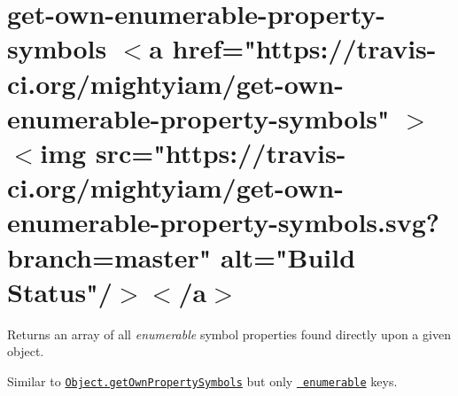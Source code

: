 \chapter{get-\/own-\/enumerable-\/property-\/symbols \texorpdfstring{$<$}{<}a href="{}https\+://travis-\/ci.\+org/mightyiam/get-\/own-\/enumerable-\/property-\/symbols"{} \texorpdfstring{$>$}{>}\texorpdfstring{$<$}{<}img src="{}https\+://travis-\/ci.\+org/mightyiam/get-\/own-\/enumerable-\/property-\/symbols.\+svg?branch=master"{} alt="{}\+Build Status"{}/\texorpdfstring{$>$}{>}\texorpdfstring{$<$}{<}/a\texorpdfstring{$>$}{>}}
\hypertarget{md_pkiclassroomrescheduler_2src_2main_2frontend_2node__modules_2get-own-enumerable-property-symbols_2_r_e_a_d_m_e}{}\label{md_pkiclassroomrescheduler_2src_2main_2frontend_2node__modules_2get-own-enumerable-property-symbols_2_r_e_a_d_m_e}
\label{md_pkiclassroomrescheduler_2src_2main_2frontend_2node__modules_2get-own-enumerable-property-symbols_2_r_e_a_d_m_e_autotoc_md13192}%
%
 Returns an array of all {\itshape enumerable} symbol properties found directly upon a given object.

Similar to \href{https://developer.mozilla.org/en-US/docs/Web/JavaScript/Reference/Global_Objects/Object/getOwnPropertySymbols}{\texttt{ {\ttfamily Object.\+get\+Own\+Property\+Symbols}}} but only \href{https://developer.mozilla.org/en-US/docs/Web/JavaScript/Enumerability_and_ownership_of_properties}{\texttt{ enumerable}} keys.


\begin{DoxyCode}{0}
\DoxyCodeLine{}
\DoxyCodeLine{//\ [Symbol()]}
\DoxyCodeLine{//\ []}

\end{DoxyCode}
 
